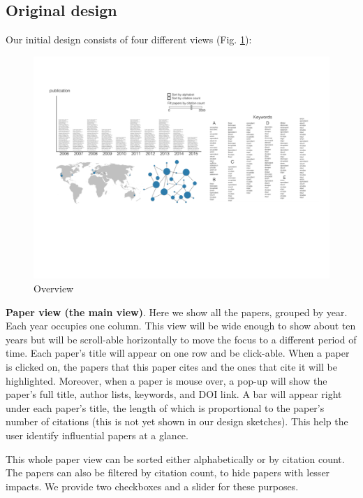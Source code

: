 \subsection{Original design}
Our initial design consists of four different views (Fig. \ref*{fig:overview}):

\begin{figure}[htb!]
    \centering
    \includegraphics[width=160mm]{visproposalDrawing_page_Part_1.pdf}
    \caption{Overview}
    \label{fig:overview}
\end{figure}

\textbf{Paper view (the main view)}. Here we show all the papers, grouped by year. Each year occupies one column. This view will be wide enough to show about ten years but will be scroll-able horizontally to move the focus to a different period of time. Each paper's title will appear on one row and be click-able. When a paper is clicked on, the papers that this paper cites and the ones that cite it will be highlighted. Moreover, when a paper is mouse over, a pop-up will show the paper's full title, author lists, keywords, and DOI link. A bar will appear right under each paper's title, the length of which is proportional to the paper's number of citations (this is not yet shown in our design sketches). This help the user identify influential papers at a glance.

This whole paper view can be sorted either alphabetically or by citation count. The papers can also be filtered by citation count, to hide papers with lesser impacts. We provide two checkboxes and a slider for these purposes.

